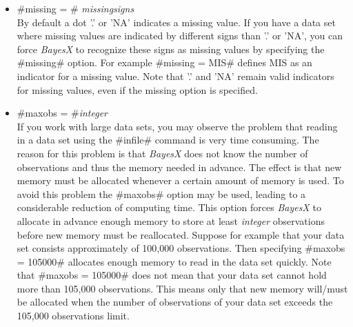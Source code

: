 
\begin{itemize}
\item #missing = # {\em missingsigns} \\
By default a dot '.' or 'NA' indicates a missing value. If you
have a data set where missing values are indicated by different
signs than '.' or 'NA', you can force {\em BayesX} to recognize
these signs as missing values by specifying the #missing# option.
For example #missing = MIS# defines MIS as an indicator for a
missing value. Note that
 '.' and 'NA' remain valid indicators for missing values, even if the missing
option is specified.

\item #maxobs = #{\em integer} \\
If you work with large data sets, you may observe the problem that
reading in a data set using the #infile# command is very time
consuming. The reason for this problem is that {\em BayesX} does
not know the number of observations and thus the memory needed in
advance. The effect is that new memory must be allocated whenever
a certain amount of memory is used. To avoid this problem the
#maxobs# option may be used, leading to a considerable reduction
of computing time. This option forces {\em BayesX} to allocate in
advance enough memory  to store at least {\em integer}
observations before new memory must be reallocated. Suppose for
example that your data set consists approximately of 100,000
observations. Then specifying #maxobs = 105000# allocates enough
memory to read in the data set quickly. Note that #maxobs = 105000#
does not mean that your data set cannot hold more than
105,000 observations. This means only that new memory will/must be
allocated when the number of observations of your data set exceeds
the 105,000 observations limit.
\end{itemize}



